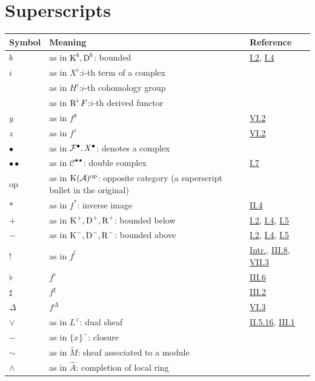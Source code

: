 \section*{Superscripts}
\begin{longtable}{@{}l p{8cm} l@{}}
	\toprule
	Symbol & Meaning & Reference \\
	\midrule
	$b$ & as in $\operatorname{K}^b, \operatorname{D}^b$: bounded & \hyperref[sec:1.2]{I.2}, \hyperref[sec:1.4]{I.4} \\
	$i$ & as in $X^i$:$i$-th term of a complex & \\
	& as in $H^i$:$i$-th cohomology group & \\
	& as in $\operatorname{R}^i F$:$i$-th derived functor & \\
	$y$ & as in $f^y$ & \hyperref[sec:6.2]{VI.2} \\
	$z$ & as in $f^z$ & \hyperref[sec:6.2]{VI.2} \\
	$\bullet$ & as in $\mathcal{F}^\bullet, X^\bullet$: denotes a complex  & \\
	$\bullet\bullet$ & as in $\mathcal{C}^{\bullet\bullet}$: double complex & \hyperref[sec:1.7]{I.7} \\
	$\mathrm{op}$ & as in $\operatorname{K}(\mathcal A)^{\mathrm{op}}$: opposite category (a superscript bullet in the original) &\\
	$*$ & as in $f^*$: inverse image & \hyperref[sec:2.4]{II.4} \\
	$+$ & as in $\operatorname{K}^+, \operatorname{D}^+, \operatorname{R}^+$: bounded below  & \hyperref[sec:1.2]{I.2}, \hyperref[sec:1.4]{I.4}, \hyperref[sec:1.5]{I.5} \\
	$-$ & as in $\operatorname{K}^-, \operatorname{D}^-, \operatorname{R}^-$: bounded above  & \hyperref[sec:1.2]{I.2}, \hyperref[sec:1.4]{I.4}, \hyperref[sec:1.5]{I.5} \\
	$!$ & as in $f^!$ & \hyperref[chap:introduction]{Intr.}, \hyperref[sec:3.8]{III.8}, \hyperref[sec:7.3]{VII.3} \\
	$\flat$ & $f^\flat$ & \hyperref[sec:3.6]{III.6} \\
	$\sharp$ & $f^\sharp$ & \hyperref[sec:3.2]{III.2} \\
	$\Delta$ & $f^\Delta$ & \hyperref[sec:6.3]{VI.3} \\
	$\vee$ & as in $L^\vee$: dual sheaf & \hyperref[prop:2.5.16]{II.5.16}, \hyperref[sec:3.1]{III.1} \\
	$-$ & as in $\{x\}^-$: closure & \\
	$\sim$ & as in $\tilde{M}$: sheaf associated to a module & \\
	$\wedge$ & as in $\hat{A}$: completion of local ring & \\
\end{longtable}

